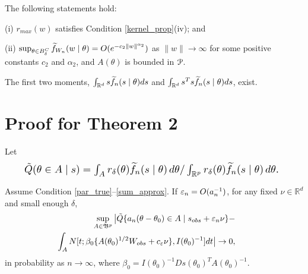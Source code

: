 \begin{condition} \label{sum_approx_tail}
	The following statements hold: 
	
	(i) $r_{max}(w)$ satisfies
	Condition \ref{kernel_prop}(iv); and 
	
	(ii) $\sup_{\theta\in B_{\delta}^{C}}\widetilde{f}_{W_{n}}(w\mid\theta)=O(e^{-c_{2}\|w\|^{\alpha_{2}}})$
	as $\|w\|\rightarrow\infty$ for some positive constants $c_{2}$
	and $\alpha_{2}$, and $A(\theta)$ is bounded in ${\cal P}$. 
\end{condition}

\begin{condition} \label{cond:likelihood_moments}
	The first two moments, $\int_{\mathbb{R}^{d}}s\widetilde{f}_{n}(s\mid\theta)ds$
	and $\int_{\mathbb{R}^d}s^{T}s\widetilde{f}_{n}(s\mid\theta)ds$, exist. 
\end{condition}


\section{Proof for Theorem 2}

\noindent Let 
\begin{equation}\notag 
    \resizebox{0.91\hsize}{!}{%
$\tilde{Q}(\theta\in A\mid s)=\int_{A}r_{\delta}(\theta)\ftil_{n}(s\mid\theta)\,d\theta/\int_{\mathbb{R}^{p}}r_{\delta}(\theta)\ftil_{n}(s\mid\theta)\,d\theta$.  
        }
\end{equation}

\begin{lemma}\label{Alemma1} Assume Condition \ref{par_true}--\ref{sum_approx}. If $\varepsilon_{n}=O(a_{n}^{-1})$, for any fixed $\nu\in\mathbb{R}^{d}$
	and small enough $\delta$, 
	\begin{eqnarray*}
	&&\hspace{-2cm}\sup_{A\in\mathfrak{B}^{p}}\big|\tilde{Q}\{a_{n}(\theta-\theta_{0})\in A\mid s_{\rm obs}+\veps_{n}\nu\}- \\
	&&\hspace{-1cm}\int_{A}N[t;\beta_{0}\{A(\theta_{0})^{1/2}W_{\rm obs}+c_{\veps}\nu\},I(\theta_{0})^{-1}]dt\big|\rightarrow0,
	\end{eqnarray*}
	in probability as $n\rightarrow\infty$, where $\beta_{0}=I(\theta_{0})^{-1}Ds(\theta_{0})^{T}A(\theta_{0})^{-1}$.
\end{lemma}

